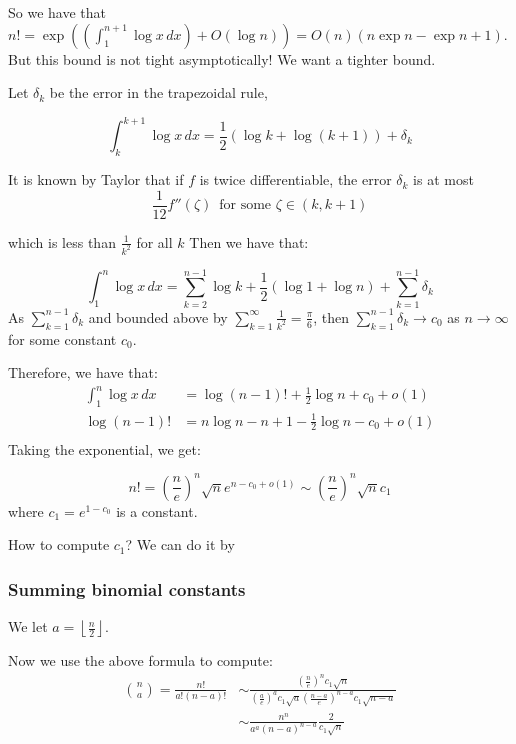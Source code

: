 \documentclass[]{article}
\theoremstyle{definition}
\numberwithin{theorem}{section}
\numberwithin{equation}{section}
\begin{document}
So we have that $n! = \exp\left( \left(\int_1^{n + 1} \log x \, dx\right) + O(\log n)\right) = O(n)(n \exp n - \exp n + 1)$. But this bound is not tight asymptotically! We want a tighter bound. 

Let $\delta_k$ be the error in the trapezoidal rule,

\begin{equation}
	\int_k^{k + 1}\log x \, dx = \frac{1}{2}(\log k + \log(k + 1)) + \delta_k
\end{equation}

It is known by Taylor that if $f$ is twice differentiable, the error $\delta_k$ is at most
\begin{equation}
	\frac{1}{12} f''(\zeta) \, \text{ for some } \zeta \in (k, k + 1)
\end{equation}

which is less than $\frac{1}{k^2}$ for all $k$ Then we have that:

\begin{equation}
	\int_1^n \log x \, dx = \sum_{k = 2}^{n - 1} \log k + \frac{1}{2}(\log 1 + \log n) + \sum_{k = 1}^{n - 1} \delta_k
\end{equation}
As $\sum_{k = 1}^{n - 1} \delta_k$ and bounded above by $\sum_{k = 1}^{\infty} \frac{1}{k^2} = \frac{\pi}{6}$, then $\sum_{k = 1}^{n - 1} \delta_k \rightarrow c_0$ as $n \rightarrow \infty$ for some constant $c_0$. 

Therefore, we have that:
\begin{align*}
	\int_1^n \log x \, dx &= \log (n - 1)! + \frac{1}{2}\log n + c_0 + o(1)\\
	\log (n - 1)! &= n \log n - n + 1 - \frac{1}{2}\log n - c_0 + o(1)\\
\end{align*}
Taking the exponential, we get:

\begin{equation}
	n! = \left(\frac{n}{e}\right)^n \sqrt{n} e^{n - c_0 + o(1)}
	\sim \left(\frac{n}{e}\right)^n \sqrt{n} c_1
\end{equation}
where $c_1 = e^{1 - c_0}$ is a constant.

How to compute $c_1$? We can do it by
\subsubsection{Summing binomial constants}
We let $a = \left\lfloor \frac{n}{2} \right\rfloor$.

Now we use the above formula to compute:
\begin{align*}
	\binom{n}{a} = \frac{n!}{a! (n - a)!} &\sim \frac{\left(\frac{n}{e}\right)^n c_1 \sqrt{n}}{\left(\frac{a}{e}\right)^a c_1 \sqrt{a} \left(\frac{n - a}{e}\right)^{n - a} c_1 \sqrt{n - a}}\\
	&\sim \frac{n^n}{a^a (n - a)^{n - a}}\frac{2}{c_1 \sqrt{n}}
\end{align*}
\end{document}
